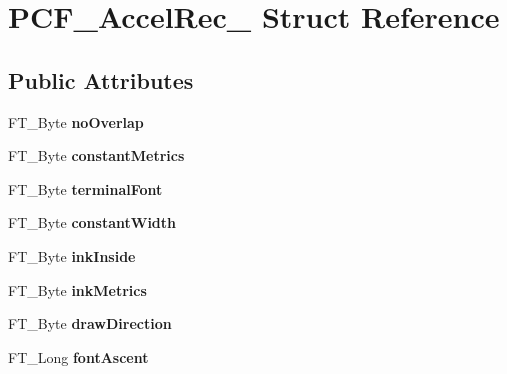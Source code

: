 \hypertarget{struct_p_c_f___accel_rec__}{}\section{P\+C\+F\+\_\+\+Accel\+Rec\+\_\+ Struct Reference}
\label{struct_p_c_f___accel_rec__}
\subsection*{Public Attributes}
\begin{DoxyCompactItemize}
\item 
\mbox{\label{struct_p_c_f___accel_rec___ac64fecfa13f845dfa798135f2fafe376}} 
F\+T\+\_\+\+Byte {\bfseries no\+Overlap}
\item 
\mbox{\label{struct_p_c_f___accel_rec___a206fa43a9a7f98bfdc3c785001fc1157}} 
F\+T\+\_\+\+Byte {\bfseries constant\+Metrics}
\item 
\mbox{\label{struct_p_c_f___accel_rec___ae766d252aaf93f0ddef014dd939c9574}} 
F\+T\+\_\+\+Byte {\bfseries terminal\+Font}
\item 
\mbox{\label{struct_p_c_f___accel_rec___a6b76976bea3aee5b00d0bcc460e1f5ea}} 
F\+T\+\_\+\+Byte {\bfseries constant\+Width}
\item 
\mbox{\label{struct_p_c_f___accel_rec___ae06af38645c0cff36b0b2a411ad1eca6}} 
F\+T\+\_\+\+Byte {\bfseries ink\+Inside}
\item 
\mbox{\label{struct_p_c_f___accel_rec___a82b6833fc548d25d252309da95525c31}} 
F\+T\+\_\+\+Byte {\bfseries ink\+Metrics}
\item 
\mbox{\label{struct_p_c_f___accel_rec___a3bc531152cae04868a08c1c1d8cb1224}} 
F\+T\+\_\+\+Byte {\bfseries draw\+Direction}
\item 
\mbox{\label{struct_p_c_f___accel_rec___a58fb2e3b32aa316257a41ed03f8fb9b0}} 
F\+T\+\_\+\+Long {\bfseries font\+Ascent}
\item 

\end{DoxyCompactItemize}

